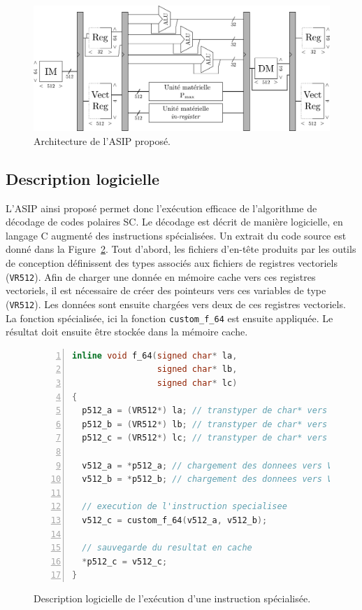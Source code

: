 \begin{figure}
\centering
\includegraphics[width=\textwidth]{main/ch3_fig/full_tensilica}
\caption{Architecture de l'ASIP proposé.}
\label{fig:full_tensilica}
\end{figure}

\subsection{Description logicielle}
L'ASIP ainsi proposé permet donc l'exécution efficace de l'algorithme de décodage de codes polaires SC. Le décodage est décrit de manière logicielle, en langage C augmenté des instructions spécialisées. Un extrait du code source est donné dans la Figure~\ref{fig:f_code}. Tout d'abord, les fichiers d'en-tête produits par les outils de conception définissent des types associés aux fichiers de registres vectoriels (\texttt{VR512}). Afin de charger une donnée en mémoire cache vers ces registres vectoriels, il est nécessaire de créer des pointeurs vers ces variables de type (\texttt{VR512}). Les données sont ensuite chargées vers deux de ces registres vectoriels. La fonction spécialisée, ici la fonction \texttt{custom\_f\_64} est ensuite appliquée. Le résultat doit ensuite être stockée dans la mémoire cache.
\begin{figure}[hb]
\begin{lstlisting}[language=C++, numbers=left, numbersep=0.3em, tabsize=2, basicstyle=\footnotesize\ttfamily]
inline void f_64(signed char* la, 
                 signed char* lb, 
                 signed char* lc)
{
  p512_a = (VR512*) la; // transtyper de char* vers VR512
  p512_b = (VR512*) lb; // transtyper de char* vers VR512
  p512_c = (VR512*) lc; // transtyper de char* vers VR512

  v512_a = *p512_a; // chargement des donnees vers VR512
  v512_b = *p512_b; // chargement des donnees vers VR512
  
  // execution de l'instruction specialisee
  v512_c = custom_f_64(v512_a, v512_b); 
  
  // sauvegarde du resultat en cache
  *p512_c = v512_c;     
}
\end{lstlisting}
\caption{Description logicielle de l'exécution d'une instruction spécialisée.}
\label{fig:f_code}
\end{figure}

